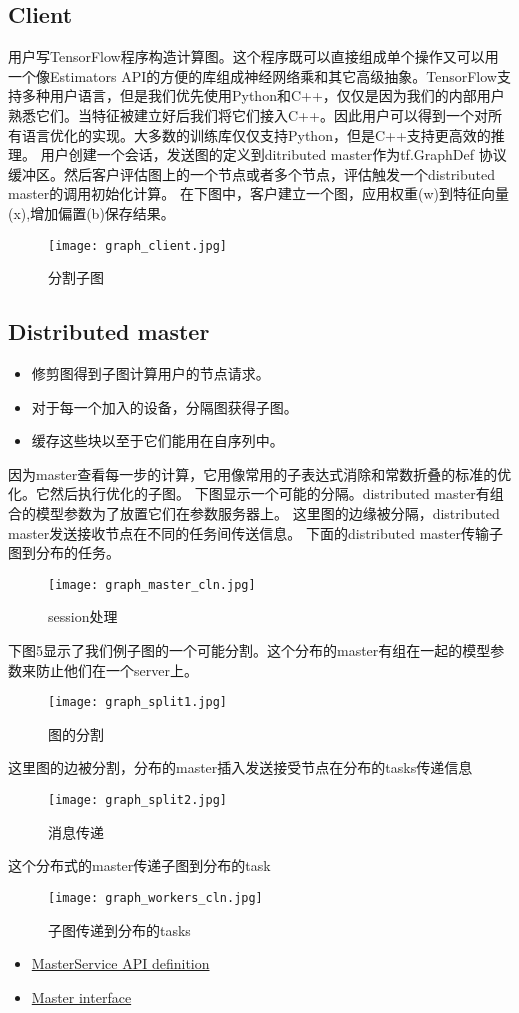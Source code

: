\subsection{Client}
用户写TensorFlow程序构造计算图。这个程序既可以直接组成单个操作又可以用一个像Estimators API的方便的库组成神经网络乘和其它高级抽象。TensorFlow支持多种用户语言，但是我们优先使用Python和C++，仅仅是因为我们的内部用户熟悉它们。当特征被建立好后我们将它们接入C++。因此用户可以得到一个对所有语言优化的实现。大多数的训练库仅仅支持Python，但是C++支持更高效的推理。
用户创建一个会话，发送图的定义到ditributed master作为tf.GraphDef 协议缓冲区。然后客户评估图上的一个节点或者多个节点，评估触发一个distributed master的调用初始化计算。
在下图中，客户建立一个图，应用权重(w)到特征向量(x),增加偏置(b)保存结果。
\begin{figure}[H]
\centering
\texttt{[image: graph\_client.jpg]}
	\caption{分割子图}
	\label{fig:tf_ext3}
\end{figure}
\subsection{Distributed master}
\begin{itemize}
\item 修剪图得到子图计算用户的节点请求。
\item 对于每一个加入的设备，分隔图获得子图。
\item 缓存这些块以至于它们能用在自序列中。
\end{itemize}
因为master查看每一步的计算，它用像常用的子表达式消除和常数折叠的标准的优化。它然后执行优化的子图。
下图显示一个可能的分隔。distributed master有组合的模型参数为了放置它们在参数服务器上。
这里图的边缘被分隔，distributed master发送接收节点在不同的任务间传送信息。
下面的distributed master传输子图到分布的任务。
\begin{figure}[H]
	\centering 
	\texttt{[image: graph\_master\_cln.jpg]}
	\caption{session处理}
	\label{fig:tf_ext4}
\end{figure}
下图5显示了我们例子图的一个可能分割。这个分布的master有组在一起的模型参数来防止他们在一个server上。
\begin{figure}[H]
	\centering 
	\texttt{[image: graph\_split1.jpg]}
	\caption{图的分割}
	\label{fig:tf_ext5}
\end{figure}
这里图的边被分割，分布的master插入发送接受节点在分布的tasks传递信息
\begin{figure}[H]
	\centering 
	\texttt{[image: graph\_split2.jpg]}
	\caption{消息传递}
	\label{fig:tf_ext6}
\end{figure}
这个分布式的master传递子图到分布的task
\begin{figure}[H]
	\centering 
	\texttt{[image: graph\_workers\_cln.jpg]}
	\caption{子图传递到分布的tasks}
	\label{fig:tf_ext7}
\end{figure}
\begin{itemize}
		\item \href{https://www.github.com/tensorflow/tensorflow/blob/r1.4/tensorflow/core/protobuf/master_service.proto}{MasterService API definition}
		\item \href{https://www.github.com/tensorflow/tensorflow/blob/r1.4/tensorflow/core/distributed_runtime/master_interface.h}{Master interface}
\end{itemize}
